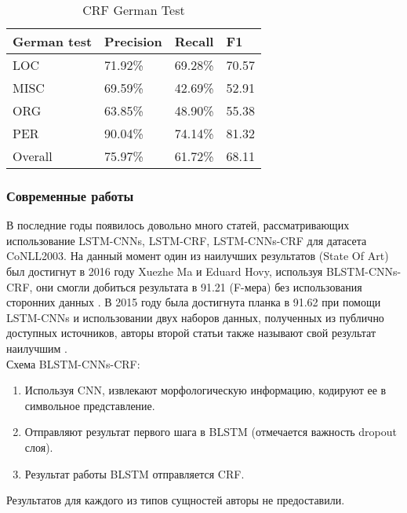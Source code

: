 \begin{table}[ht]
\centering
\caption{CRF German Test}
\label{crf_ger}
\begin{tabular}{|l|l|l|l|}
\hline
\textbf{German test} & \textbf{Precision} & \textbf{Recall} & \textbf{F1} \\ \hline
LOC                  & 71.92\%            & 69.28\%         & 70.57       \\ \hline
MISC                 & 69.59\%            & 42.69\%         & 52.91       \\ \hline
ORG                  & 63.85\%            & 48.90\%         & 55.38       \\ \hline
PER                  & 90.04\%            & 74.14\%         & 81.32       \\ \hline
Overall              & 75.97\%            & 61.72\%         & 68.11       \\ \hline
\end{tabular}
\end{table}

\subsubsection{Современные работы}

В последние годы появилось довольно много статей, рассматривающих использование LSTM-CNNs, LSTM-CRF, LSTM-CNNs-CRF для датасета CoNLL2003. На данный момент один из наилучших результатов (State Of Art) был достигнут в 2016 году Xuezhe Ma и Eduard Hovy, используя BLSTM-CNNs-CRF, они смогли добиться результата в 91.21 (F-мера) без использования сторонних данных \cite{DBLP:journals/corr/MaH16}. В 2015 году была достигнута планка в 91.62 при помощи LSTM-CNNs и использовании двух наборов данных, полученных из публично доступных источников, авторы второй статьи также называют свой результат наилучшим \cite{DBLP:journals/corr/ChiuN15}.  \\

Схема BLSTM-CNNs-CRF:

\begin{enumerate}
\item Используя CNN, извлекают морфологическую информацию, кодируют ее в символьное представление.
\item Отправляют результат первого шага в BLSTM (отмечается важность dropout слоя).
\item Результат работы BLSTM отправляется CRF.
\end{enumerate}

Результатов для каждого из типов сущностей авторы не предоставили.